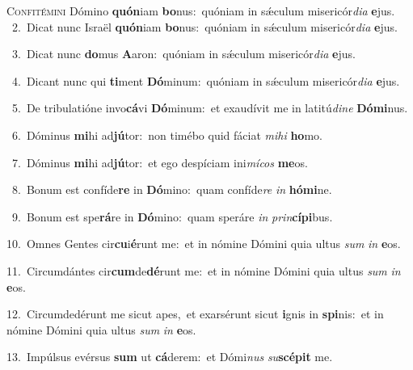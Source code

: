 \lettrine{\initial\textcolor{\initialcolor}{C}}{onfitémini} Dómino \textbf{quón}\-iam \textbf{bo}\-nus:~\star quóniam in sǽculum misericór\-\textit{di}\-\textit{a} \textbf{e}\-jus.\\
{\numbfont\textcolor{\numbcolor}{~2.}}~Dicat nunc Israël \textbf{quón}\-iam \textbf{bo}\-nus:~\star quóniam in sǽculum misericór\-\textit{di}\-\textit{a} \textbf{e}\-jus.\par
{\numbfont\textcolor{\numbcolor}{~3.}}~Dicat nunc \textbf{do}\-mus \textbf{A}\-aron:~\star quóniam in sǽculum misericór\-\textit{di}\-\textit{a} \textbf{e}\-jus.\par
{\numbfont\textcolor{\numbcolor}{~4.}}~Dicant nunc qui \textbf{ti}\-ment \textbf{Dó}\-minum:~\star quóniam in sǽculum misericór\-\textit{di}\-\textit{a} \textbf{e}\-jus.\par
{\numbfont\textcolor{\numbcolor}{~5.}}~De tribulatióne invo\-\textbf{cá}\-vi \textbf{Dó}\-minum:~\star et exaudívit me in latitú\-\textit{di}\-\textit{ne} \textbf{Dó}\-\textbf{mi}nus.\par
{\numbfont\textcolor{\numbcolor}{~6.}}~Dóminus \textbf{mi}\-hi ad\-\textbf{jú}\-tor:~\star non timébo quid fáciat \textit{mi}\-\textit{hi} \textbf{ho}\-mo.\par
{\numbfont\textcolor{\numbcolor}{~7.}}~Dóminus \textbf{mi}\-hi ad\-\textbf{jú}\-tor:~\star et ego despíciam ini\-\textit{mí}\-\textit{cos} \textbf{me}\-os.\par
{\numbfont\textcolor{\numbcolor}{~8.}}~Bonum est confíde\textbf{re} in \textbf{Dó}\-mino:~\star quam confíde\textit{re} \textit{in} \textbf{hó}\-\textbf{mi}ne.\par
{\numbfont\textcolor{\numbcolor}{~9.}}~Bonum est spe\-\textbf{rá}\-re in \textbf{Dó}\-mino:~\star quam speráre \textit{in} \textit{prin}\-\textbf{cí}\textbf{pi}bus.\par
{\numbfont\textcolor{\numbcolor}{10.}}~Omnes Gentes cir\-\textbf{cu}\-i\-\textbf{é}\-runt me:~\star et in nómine Dómini quia ultus \textit{sum} \textit{in} \textbf{e}\-os.\par
{\numbfont\textcolor{\numbcolor}{11.}}~Circumdántes cir\-\textbf{cum}\-de\-\textbf{dé}\-runt me:~\star et in nómine Dómini quia ultus \textit{sum} \textit{in} \textbf{e}\-os.\par
{\numbfont\textcolor{\numbcolor}{12.}}~Circumdedérunt me sicut apes,~\dagger et exarsérunt sicut \textbf{i}\-gnis in \textbf{spi}\-nis:~\star et in nómine Dómini quia ultus \textit{sum} \textit{in} \textbf{e}\-os.\par
{\numbfont\textcolor{\numbcolor}{13.}}~Impúlsus evérsus \textbf{sum} ut \textbf{cá}\-derem:~\star et Dómi\textit{nus} \textit{su}\-\textbf{scé}\textbf{pit} me.\par
